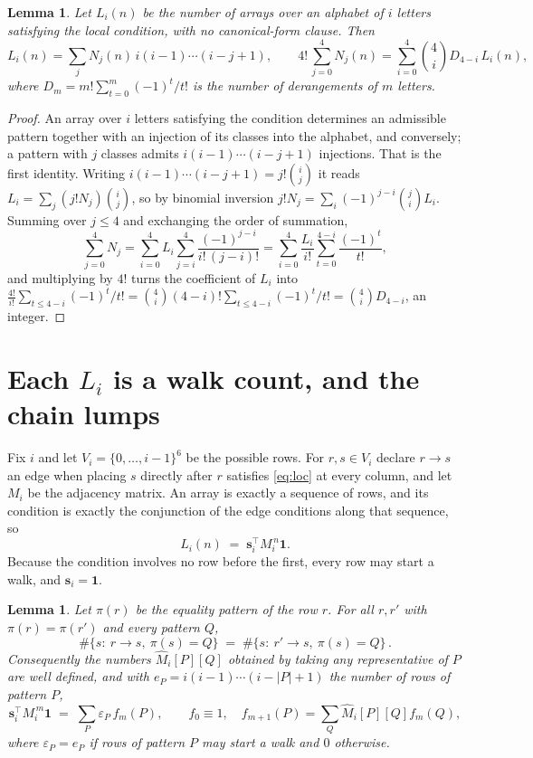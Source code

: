 \documentclass[11pt,a4paper]{article}
\theoremstyle{plain}
\newtheorem{lemma}[theorem]{Lemma}
\theoremstyle{definition}
\begin{document}
\begin{lemma}\label{lem:inv}
Let $L_i(n)$ be the number of arrays over an alphabet of $i$ letters satisfying the local
condition, with no canonical-form clause. Then
\[
L_i(n)=\sum_j N_j(n)\,i(i-1)\cdots(i-j+1),
\qquad
4!\,\sum_{j=0}^{4}N_j(n)=\sum_{i=0}^{4}\binom{4}{i}D_{4-i}\,L_i(n),
\]
where $D_m=m!\sum_{t=0}^{m}(-1)^t/t!$ is the number of derangements of $m$ letters.
\end{lemma}

\begin{proof}
An array over $i$ letters satisfying the condition determines an admissible pattern together
with an injection of its classes into the alphabet, and conversely; a pattern with $j$
classes admits $i(i-1)\cdots(i-j+1)$ injections. That is the first identity. Writing
$i(i-1)\cdots(i-j+1)=j!\binom{i}{j}$ it reads $L_i=\sum_j (j!N_j)\binom{i}{j}$, so by
binomial inversion $j!N_j=\sum_{i}(-1)^{j-i}\binom{j}{i}L_i$. Summing over
$j\le 4$ and exchanging the order of summation,
\[
\sum_{j=0}^{4}N_j=\sum_{i=0}^{4}L_i\sum_{j=i}^{4}\frac{(-1)^{j-i}}{i!\,(j-i)!}
=\sum_{i=0}^{4}\frac{L_i}{i!}\sum_{t=0}^{4-i}\frac{(-1)^t}{t!} ,
\]
and multiplying by $4!$ turns the coefficient of $L_i$ into
$\frac{4!}{i!}\sum_{t\le 4-i}(-1)^t/t!=\binom{4}{i}(4-i)!\sum_{t\le 4-i}(-1)^t/t!
=\binom{4}{i}D_{4-i}$, an integer.
\end{proof}

\section{Each $L_i$ is a walk count, and the chain lumps}

Fix $i$ and let $V_i=\{0,\dots,i-1\}^{6}$ be the possible rows. For $r,s\in V_i$
declare $r\to s$ an edge when placing $s$ directly after $r$ satisfies \eqref{eq:loc} at
every column, and let $M_i$ be the adjacency matrix. An array is exactly a sequence of
rows, and its condition is exactly the conjunction of the edge conditions along that
sequence, so
\[
L_i(n)\;=\;\mathbf{s}_i^{\!\top}M_i^{\,n}\mathbf{1} .
\]
Because the condition involves no row before the first, every
row may start a walk, and $\mathbf{s}_i=\mathbf{1}$.

\begin{lemma}\label{lem:lump}
Let $\pi(r)$ be the equality pattern of the row $r$. For all $r,r'$ with
$\pi(r)=\pi(r')$ and every pattern $Q$,
\[
\#\{s:\ r\to s,\ \pi(s)=Q\}\;=\;\#\{s:\ r'\to s,\ \pi(s)=Q\}\, .
\]
Consequently the numbers $\widehat M_i[P][Q]$ obtained by taking any representative of $P$
are well defined, and with $e_P=i(i-1)\cdots(i-|P|+1)$ the number of rows of pattern $P$,
\[
\mathbf{s}_i^{\!\top}M_i^{\,m}\mathbf{1}\;=\;\sum_P \varepsilon_P\,f_m(P),
\qquad f_0\equiv1,\quad f_{m+1}(P)=\sum_Q\widehat M_i[P][Q]f_m(Q),
\]
where $\varepsilon_P=e_P$ if rows of pattern $P$ may start a walk and $0$ otherwise.
\end{lemma}
\end{document}
